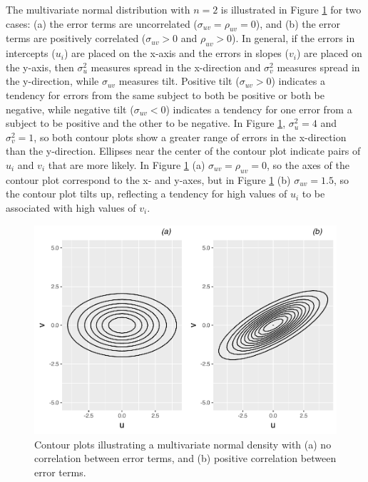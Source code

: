 \documentclass[
]{krantz}
\begin{document}
The multivariate normal distribution with \(n=2\) is illustrated in Figure \ref{fig:contour-boundary} for two cases: (a) the error terms are uncorrelated (\(\sigma_{uv}=\rho_{uv}=0\)), and (b) the error terms are positively correlated (\(\sigma_{uv}>0\) and \(\rho_{uv} > 0\)). In general, if the errors in intercepts (\(u_{i}\)) are placed on the x-axis and the errors in slopes (\(v_{i}\)) are placed on the y-axis, then \(\sigma_{u}^{2}\) measures spread in the x-direction and \(\sigma_{v}^{2}\) measures spread in the y-direction, while \(\sigma_{uv}\) measures tilt. Positive tilt (\(\sigma_{uv}>0\)) indicates a tendency for errors from the same subject to both be positive or both be negative, while negative tilt (\(\sigma_{uv}<0\)) indicates a tendency for one error from a subject to be positive and the other to be negative. In Figure \ref{fig:contour-boundary}, \(\sigma_{u}^{2}=4\) and \(\sigma_{v}^{2}=1\), so both contour plots show a greater range of errors in the x-direction than the y-direction. Ellipses near the center of the contour plot indicate pairs of \(u_{i}\) and \(v_{i}\) that are more likely. In Figure \ref{fig:contour-boundary} (a) \(\sigma_{uv}=\rho_{uv}=0\), so the axes of the contour plot correspond to the x- and y-axes, but in Figure \ref{fig:contour-boundary} (b) \(\sigma_{uv}=1.5\), so the contour plot tilts up, reflecting a tendency for high values of \(u_{i}\) to be associated with high values of \(v_{i}\).

\begin{figure}

{\centering \includegraphics[width=0.6\linewidth]{bookdown-BeyondMLR_files/figure-latex/contour-boundary-1} 

}

\caption{Contour plots illustrating a multivariate normal density with (a) no correlation between error terms, and (b) positive correlation between error terms.}\label{fig:contour-boundary}
\end{figure}
\end{document}
